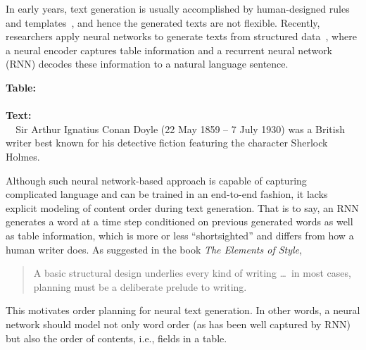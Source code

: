 \documentclass[letterpaper]{article} %
\begin{document}
In early years, text generation is usually accomplished by human-designed rules and templates~\cite{green2006generation,turner2010generating}, and hence the generated texts are not flexible. Recently, researchers apply neural networks to generate texts from structured data~\cite{wikibio}, where a neural encoder captures table information and a recurrent neural network (RNN) decodes these information to a natural language sentence.

\begin{table}[!t]
	\textbf{Table:}\\[.2cm]
	\\[.2cm]

	\textbf{Text:}\\[.1cm]
	{\small\verb|  |Sir Arthur Ignatius Conan Doyle (22 May 1859 -- 7 July 1930) was a British writer best known for his detective fiction featuring the character Sherlock Holmes.}
	
	\caption{Example of a Wikipedia infobox and a reference text.}\label{tab:example}
\end{table}

Although such neural network-based approach is capable of capturing complicated language and can be trained in an end-to-end fashion, it lacks explicit modeling of content order during text generation. That is to say, an RNN generates a word at a time step conditioned on previous generated words as well as table information, which is more or less ``shortsighted'' and differs from how a human writer does. As suggested in the book \textit{The Elements of Style},
\begin{quote}
	A basic structural design underlies every kind of writing \dots\
	in most cases, planning must be a deliberate prelude to writing. \cite{element}
\end{quote}
This motivates order planning for neural text generation. In other words, a neural network should model not only word order (as has been well captured by RNN) but also the order of contents, i.e., fields in a table.
\end{document}
